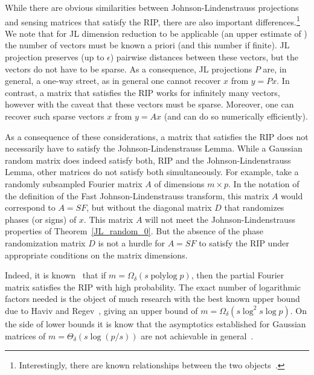 While there are obvious similarities between  Johnson-Lindenstrauss projections and sensing matrices that satisfy the RIP, there are also important differences.\footnote{Interestingly, there are known relationships between the two objects~\cite{krahmer2011new}.}
We note that for JL dimension reduction to be applicable (an upper estimate of ) the number of vectors must be known a priori (and this number if finite).  JL projection preserves (up to $\epsilon$) pairwise distances between these vectors, but the vectors do not have to be sparse. As a consequence, JL  projections $P$ are, in general, a one-way street, as in general
 one cannot  recover $x$ from $y=Px$.
In contrast, a matrix that satisfies the RIP works for infinitely many vectors, however with the caveat that these vectors  must be sparse.  Moreover,  one can recover such sparse vectors $x$ from $y=Ax$ (and can do so numerically efficiently). 

As a consequence of these considerations, a matrix that satisfies the RIP does not necessarily have to satisfy the Johnson-Lindenstrauss Lemma.
While a Gaussian random matrix does indeed satisfy both, RIP and the Johnson-Lindenstrauss Lemma, other matrices do not satisfy both simultaneously. For example, take a randomly subsampled Fourier matrix $A$ of dimensions $m \times p$. 
In the notation of the definition of the Fast Johnson-Lindenstrauss transform, this matrix $A$ would correspond to
$A= SF$, but without the diagonal matrix $D$ that randomizes phases (or signs) of $x$. This matrix $A$ will not meet the Johnson-Lindenstrauss properties of Theorem~\ref{JL_random_0}. But the absence of the phase randomization matrix $D$ is not a hurdle for $A=SF$ to satisfy the RIP under appropriate conditions 
on the matrix dimensions.

Indeed, it is known~\cite{Candes_CS4} that if $m=\Omega_\delta(s\operatorname{polylog} p)$, then the partial Fourier matrix satisfies the RIP with high probability. The exact number of logarithmic factors needed is the object of much research with the best known upper bound due to Haviv and Regev~\cite{Haviv_Regev_2016}, giving an upper bound of $m=\Omega_\delta(s\log^2s\log p)$. On the side of lower bounds it is know that the asymptotics established for Gaussian matrices of $m=\Theta_\delta(s\log (p/s))$ are not achievable in general~\cite{Bandeira_UncertaintyPrinciple}.



